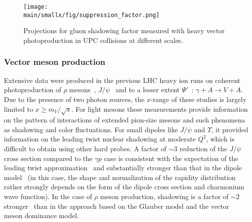 \documentclass[../report.tex]{subfiles}
\providecommand{\main}{..}
\begin{document}
\begin{figure}
\centering
\texttt{[image: \\main/smallx/fig/suppression\_factor.png]}
\caption{Projections for gluon shadowing factor measured with heavy vector photoproduction in \PbPb UPC collisions at different scales.}
\label{fig:r}
\end{figure}

\subsubsection{Vector meson production}


Extensive data were produced in the previous LHC heavy ion runs on coherent photoproduction  of $\rho$ mesons~\cite{Adam:2015gsa}, 
$J/\psi$~\cite{Abbas:2013oua,Abelev:2012ba,Khachatryan:2016qhq} and to a lesser extent $\Psi'$~\cite{Adam:2015sia}: 
$\gamma+ A \to V +A$. Due to the presence of two photon sources, the $x$-range of these studies is largely  limited
to $x\ge m_V/\sqrt{s}$. For light mesons these measurements provide information on the pattern of interactions of extended pion-size mesons and such phenomena as shadowing and color fluctuations. For small dipoles like $J/\psi$ and $\Upsilon$, 
it provided information on the leading twist nuclear shadowing at moderate $Q^2$, which is difficult to obtain using other hard probes. A factor of $\sim 3$ reduction of the $J/\psi$ 
cross section compared to the $\gamma p$ case is consistent with the expectation of the leading twist 
approximation~\cite{Guzey:2013xba,Guzey:2013qza} and substantially stronger than that in the dipole 
model~\cite{Lappi:2013am} (in this case, the shape and normalization of the rapidity distribution rather 
strongly depends on the form of the dipole cross section and charmonium wave function).
In the case of $\rho$ meson production, shadowing is a factor of $\sim 2$ stronger~\cite{Frankfurt:2015cwa} than in the approach based on
the Glauber model and the vector meson dominance model.
\end{document}
